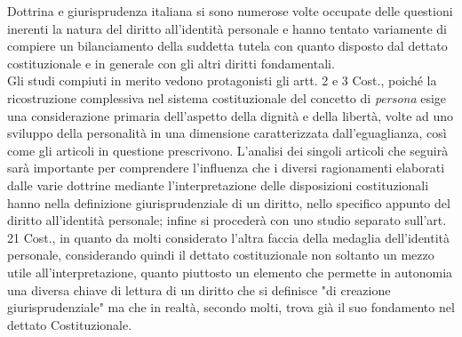 Dottrina e giurisprudenza italiana si sono numerose volte occupate delle questioni inerenti la natura del diritto all'identità personale e hanno tentato variamente di compiere un bilanciamento della suddetta tutela con quanto disposto dal dettato costituzionale e in generale con gli altri diritti fondamentali.
\\Gli studi compiuti in merito vedono protagonisti gli artt. 2 e 3 Cost., poiché la ricostruzione complessiva nel sistema costituzionale del concetto di \textit{persona} esige una considerazione primaria dell'aspetto della dignità e della libertà, volte ad uno sviluppo della personalità in una dimensione caratterizzata dall'eguaglianza, così come gli articoli in questione prescrivono.
L'analisi dei singoli articoli che seguirà sarà importante per comprendere l'influenza che i diversi ragionamenti elaborati dalle varie dottrine mediante l'interpretazione delle disposizioni costituzionali hanno nella definizione giurisprudenziale di un diritto, nello specifico appunto del diritto all'identità personale; infine si procederà con uno studio separato sull'art. 21 Cost., in quanto da molti considerato l'altra faccia della medaglia dell'identità personale, considerando quindi il dettato costituzionale non soltanto un mezzo utile all'interpretazione, quanto piuttosto un elemento che permette in autonomia una diversa chiave di lettura di un diritto che si definisce "di creazione giurisprudenziale" ma che in realtà, secondo molti, trova già il suo fondamento nel dettato Costituzionale.

